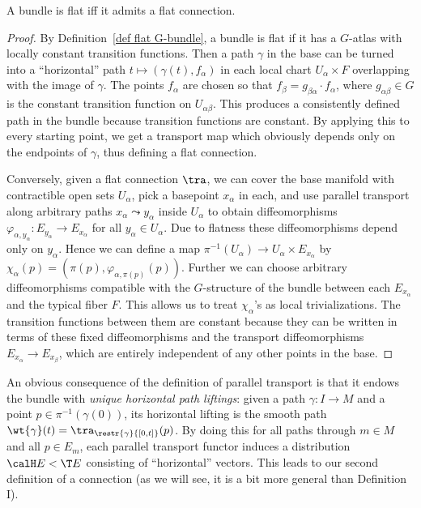\begin{prop}
    A bundle is flat iff it admits a flat connection.
\end{prop}
\begin{proof}
    By Definition~\ref{def flat G-bundle}, a bundle is flat if it  has a $G$-atlas with locally constant transition functions. Then a path $\gamma$ in the base can be turned into a ``horizontal'' path $t\mapsto (\gamma(t),f_\alpha)$ in each local chart $U_\alpha\times F$ overlapping with the image of $\gamma$. The points $f_\alpha$ are chosen so that $f_\beta=g_{\beta\alpha}\cdot f_\alpha$, where $g_{\alpha\beta}\in G$ is the constant transition function on $U_{\alpha\beta}$. This produces a consistently defined path in the bundle because transition functions are constant. By applying this to every starting point, we get a transport map which obviously depends only on the endpoints of $\gamma$, thus defining a flat connection.

    Conversely, given a flat connection $\tra$, we can cover the base manifold with contractible open sets $U_\alpha$, pick a basepoint $x_\alpha$ in each, and use parallel transport along arbitrary paths $x_\alpha\leadsto y_\alpha$ inside $U_\alpha$ to obtain diffeomorphisms $\varphi_{\alpha,y_\alpha}:E_{y_\alpha}\to E_{x_\alpha}$ for all $y_\alpha\in U_\alpha$. Due to flatness these diffeomorphisms depend only on $y_\alpha$. Hence we can define a map $\pi^{-1}(U_\alpha)\to U_\alpha\times E_{x_\alpha}$ by $\chi_\alpha(p)=(\pi(p),\varphi_{\alpha,\pi(p)}(p))$. Further we can choose arbitrary diffeomorphisms compatible with the $G$-structure of the bundle between each $E_{x_\alpha}$ and the typical fiber $F$. This allows us to treat $\chi_\alpha$'s as local trivializations. The transition functions between them are constant because they can be written in terms of these fixed diffeomorphisms and the transport diffeomorphisms $E_{x_\alpha}\to E_{x_\beta}$, which are entirely independent of any other points in the base.
\end{proof}

An obvious consequence of the definition of parallel transport is that it endows the bundle with \emph{unique horizontal path liftings}: given a path $\gamma:I\to M$ and a point $p\in\pi^{-1}(\gamma(0))$, its horizontal lifting is the smooth path $\wt{\gamma}(t)=\tra_{\restr{\gamma}{[0,t]}}(p)$. By doing this for all paths through $m\in M$ and all $p\in E_m$, each parallel transport functor induces a distribution $\calH E<\T E$ consisting of ``horizontal'' vectors. This leads to our second definition of a connection (as we will see, it is a bit more general than Definition I).


